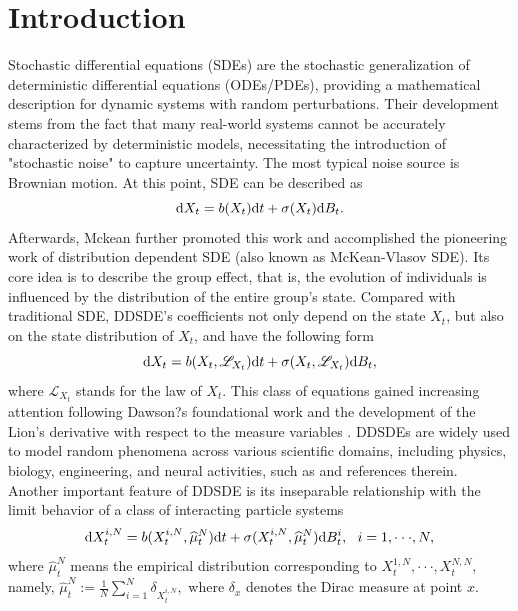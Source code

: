 \documentclass[12pt]{article}
\def\L{\mathscr{L}}
\def\d{\text{\rm{d}}}
\numberwithin{equation}{section}
\begin{document}
	\section{Introduction}
	Stochastic differential equations (SDEs) are the stochastic generalization of deterministic differential equations (ODEs/PDEs), providing a mathematical description for dynamic systems with random perturbations. Their development stems from the fact that many real-world systems cannot be accurately characterized by deterministic models, necessitating the introduction of "stochastic noise" to capture uncertainty. The most typical noise source is Brownian motion. At this point, SDE can be described as
	\begin{equation}
		\d X_t=b(X_t)\d t+\sigma(X_t)\d B_t.
	\end{equation}
	Afterwards, Mckean \cite{Mckean} further promoted this work and accomplished the pioneering work of distribution dependent SDE (also known as McKean-Vlasov SDE). Its core idea is to describe the group effect, that is, the evolution of individuals is influenced by the distribution of the entire group's state. Compared with traditional SDE, DDSDE's coefficients not only depend on the state $X_t$, but also on the state distribution of $X_t$, and have the following form
	\begin{equation}\label{eq-1.2}
		\d X_t=b(X_t, \L_{X_t})\d t+\sigma(X_t, \L_{X_t})\d B_t,
	\end{equation}
	where $\L_{X_t}$ stands for the law of $X_t$. This class of equations gained increasing attention following Dawson?s foundational work \cite{Da} and the development of the Lion's derivative with respect to the measure variables \cite{Li}. DDSDEs are  widely used to model random phenomena across various scientific domains, including physics, biology, engineering, and neural activities, such as \cite{BFFT,BCC,BFT,Carmona2} and references therein.
	Another important feature of DDSDE is its inseparable relationship with the limit behavior of a class of interacting particle systems
	\begin{equation}\label{eq-1.3}
		\d X_t^{i,N}= b(X_t^{i,N},\widehat{\mu}_t^N)\d t+\sigma(X_t^{i,N},\widehat{\mu}_t^N)\d B_t^i,~~ i=1,\cdot\cdot\cdot,N,
	\end{equation}
	where $\widehat{\mu}_t^N$ means the empirical distribution corresponding to $X_t^{1,N},\cdot\cdot\cdot, X_t^{N,N},$ namely,
	$
	\widehat{\mu}_t^N:=\frac{1}{N}\sum^N_{i=1}\delta_{X_t^{i,N}},
	$
	where $\delta_x$ denotes the Dirac measure at point $x$.
\end{document}
